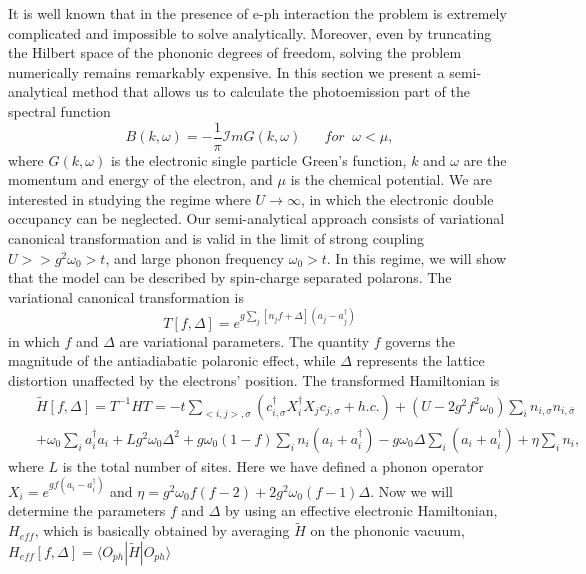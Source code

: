 \documentclass[article,11pt]{revtex4}
\begin{document}
It is well known that in the presence of e-ph interaction the problem is
extremely complicated and impossible to solve
analytically. Moreover, even by truncating the Hilbert space of the phononic degrees of freedom, solving the problem numerically remains remarkably expensive. In this section we present a semi-analytical method
that allows us to calculate the photoemission part of the spectral function
\begin{equation}
B(k,\omega)=-\frac{1}{\pi} \mathcal{I}mG(k,\omega)  \mspace{30mu} for \mspace{10mu} \omega < \mu,
\label{B_green}
\end{equation}
 where $G(k,\omega)$ is the electronic single particle Green's function, $k$ and $\omega$ are the momentum and energy of the electron, and $\mu$ is the chemical potential.
 We are interested in studying the regime where $U \rightarrow \infty$, in which the electronic double occupancy can be neglected. Our semi-analytical approach consists of variational canonical transformation and is valid in the limit of strong coupling $U >> g^2 \omega_0 > t$, and large phonon frequency $\omega_0 >t$. In this regime, we will show that the model can be described by spin-charge separated polarons. 
 The variational canonical transformation is
\begin{equation}
\label{can_trans} T[f,\Delta] = e^{g \sum\limits_j [n_j f + \Delta](a_j - a^\dagger_j)}
\end{equation}
in which $f$ and $\Delta$ are variational parameters. The quantity $f$ governs the magnitude of the antiadiabatic polaronic effect, while $\Delta$ represents the lattice distortion unaffected by the electrons' position. The transformed Hamiltonian is
\begin{eqnarray}
\label{trans_HH_1}
&&\tilde{H}[f,\Delta]=T^{-1} HT=-t \sum\limits_{<i,j>,
\sigma}(c^\dagger_{i,\sigma} X^\dagger_i X_j c_{j,\sigma} +
h.c.) + (U-2 g^2 f^2 \omega_0) \sum\limits_{i} n_{i,\sigma} n_{i,\bar{\sigma}} \\
&&+ \omega_0 \sum\limits_i a^\dagger_i a_i + L g^2 \omega_0 \Delta^2 + g \omega_0 (1-f) \sum\limits_i n_i (a_i+a^\dagger_i) - g
\omega_0 \Delta \sum\limits_i (a_i+a^\dagger_i)  + \eta \sum\limits_i n_i , \nonumber
\end{eqnarray}
where $L$ is the total number of sites. Here we have defined a phonon operator $X_i = e^{g f (a_i -
a^\dagger_i)}$ and $\eta = g^2 \omega_0 f (f-2) + 2 g^2 \omega_0
(f-1) \Delta$. 
Now we will determine the parameters $f$ and $\Delta$ by using an effective electronic Hamiltonian, $H_{eff}$, which is basically obtained by averaging $\tilde{H}$ on the phononic vacuum, $H_{eff} [f,\Delta] = \langle O_{ph}|\tilde{H}|O_{ph}\rangle$
\end{document}
